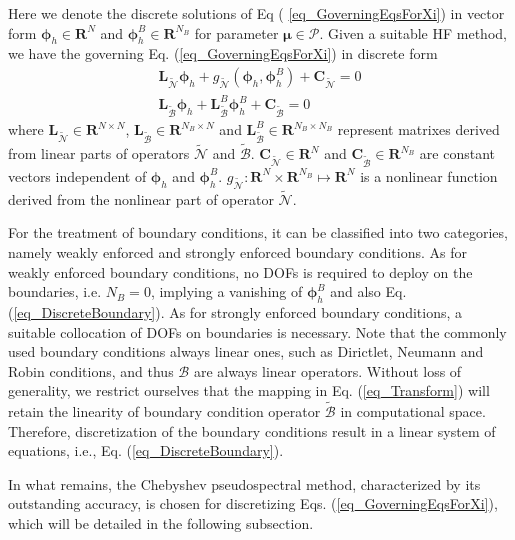 \documentclass[preprint, 10pt]{elsarticle}
\begin{document}
Here we denote the discrete solutions of Eq ( \ref{eq_GoverningEqsForXi}) in vector form $\pmb{\phi} _h \in \mathbf{R}^{N  }$ and $\pmb{\phi} _h^{B} \in \mathbf{R}^{N_B}$ for parameter $\pmb{\mu}  \in \mathcal{P}$.
Given a suitable HF method, we have the governing Eq. (\ref{eq_GoverningEqsForXi}) in discrete form
\begin{align}
\mathbf{L}_{\widetilde {\mathcal{N}}}\pmb{\phi}_h +g_{\widetilde {\mathcal{N}}}(\pmb{\phi}_h, \pmb{\phi}_h^{B})
+\mathbf{C}_{\widetilde {\mathcal{N}}}
= 0
\label{eq_DiscreteEqs}
\\
\mathbf{L}_{\widetilde {\mathcal{B}}} \pmb{\phi}_h + \mathbf{L}_{\widetilde {\mathcal{B}}}^{B} \pmb{\phi}_h^{B}
+\mathbf{C}_{\widetilde {\mathcal{B}}}
= 0
\label{eq_DiscreteBoundary}
\end{align}
where $\mathbf{L}_{\widetilde {\mathcal{N}}} \in \mathbf{R}^{N \times N}$, $\mathbf{L}_{\widetilde {\mathcal{B}}} \in \mathbf{R}^{N_B \times N}$ and $\mathbf{L}_{\widetilde {\mathcal{B}}}^{B} \in \mathbf{R}^{N_B \times N_B}$ represent matrixes derived from linear parts of operators $\widetilde {\mathcal{N}}$ and $\widetilde {\mathcal{B}}$.
$\mathbf{C}_{\widetilde {\mathcal{N}}} \in \mathbf{R}^{N}$ and $\mathbf{C}_{\widetilde {\mathcal{B}}} \in \mathbf{R}^{N_B}$ are constant vectors independent of $\pmb{\phi} _h$ and $\pmb{\phi} _h^B$.
$g_{\widetilde {\mathcal{N}}}: \mathbf{R}^N \times \mathbf{R}^{N_B} \mapsto \mathbf{R}^N$ is a nonlinear function derived from the nonlinear part of operator $\widetilde {\mathcal{N}}$.

For the treatment of boundary conditions, it can be classified into two categories, namely weakly enforced and strongly enforced boundary conditions.
As for weakly enforced boundary conditions, no DOFs is required to deploy on the boundaries, i.e. $N_B=0$, implying a vanishing of $\pmb{\phi} _h^{B}$ and also Eq. (\ref{eq_DiscreteBoundary}). As for strongly enforced boundary conditions, a suitable collocation of DOFs on boundaries is necessary. Note that the commonly used boundary conditions always linear ones, such as Dirictlet, Neumann and Robin conditions, and thus $\mathcal{B}$ are always linear operators. Without loss of generality, we restrict ourselves that the mapping in Eq. (\ref{eq_Transform}) will retain the linearity of boundary condition operator $\widetilde {\mathcal{B}}$ in computational space. Therefore, discretization of the boundary conditions result in a linear system of equations, i.e., Eq. (\ref{eq_DiscreteBoundary}).

In what remains, the Chebyshev pseudospectral method, characterized by its outstanding accuracy, is chosen for discretizing Eqs. (\ref{eq_GoverningEqsForXi}),  which will be detailed in the following subsection.
\end{document}
